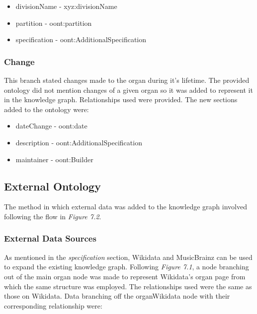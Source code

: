 \vspace{-0.1cm}
\begin{itemize}
    \itemsep0em 
    \item divisionName - xyz:divisionName
    \vspace{-0.05cm}
    \item partition - oont:partition
    \vspace{-0.05cm}
    \item specification - oont:AdditionalSpecification
\end{itemize}

\subsubsection{Change}
\hspace*{0.5cm} This branch stated changes made to the organ during it's lifetime. The provided ontology did not mention changes of a given organ so it was added to represent it in the knowledge graph. Relationships used were provided. The new sections added to the ontology were:

\vspace{-0.15cm}
\begin{itemize}
    \itemsep0em 
    \item dateChange - oont:date 
    \vspace{-0.05cm}
    \item description - oont:AdditionalSpecification
    \vspace{-0.05cm}
    \item maintainer - oont:Builder
\end{itemize}
\vspace{-0.25cm}

\subsection{External Ontology}
\hspace*{0.5cm} The method in which external data was added to the knowledge graph involved following the flow in \textit{Figure 7.2}.

\subsubsection{External Data Sources}
\hspace*{0.5cm} As mentioned in the \textit{specification} section, Wikidata and MusicBrainz can be used to expand the existing knowledge graph. Following \textit{Figure 7.1}, a node branching out of the main organ node was made to represent Wikidata's organ page \cite{organwikidata} from which the same structure was employed. The relationships used were the same as those on Wikidata. Data branching off the organWikidata node with their corresponding relationship were:

